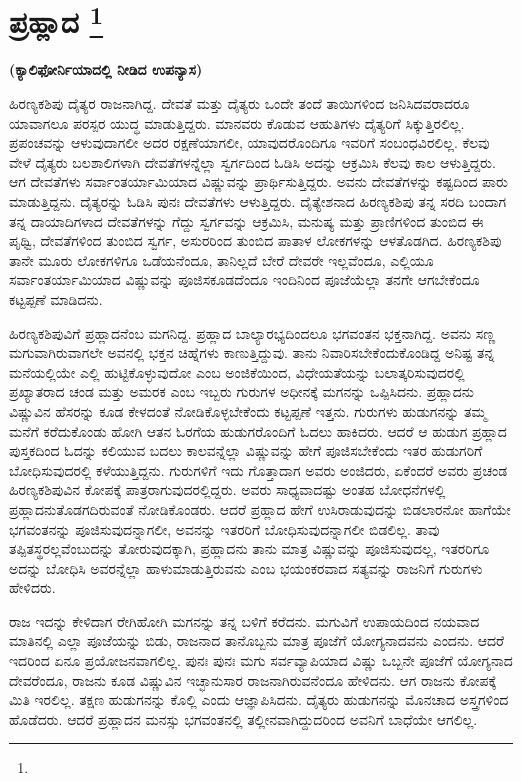 
\chapter[ಪ್ರಹ್ಲಾದ]{ಪ್ರಹ್ಲಾದ \protect\footnote{}}

\centerline{\textbf{(ಕ್ಯಾಲಿಫೋರ್ನಿಯಾದಲ್ಲಿ ನೀಡಿದ ಉಪನ್ಯಾಸ)}}

ಹಿರಣ್ಯಕಶಿಪು ದೈತ್ಯರ ರಾಜನಾಗಿದ್ದ. ದೇವತೆ ಮತ್ತು ದೈತ್ಯರು ಒಂದೇ ತಂದೆ ತಾಯಿಗಳಿಂದ ಜನಿಸಿದವರಾದರೂ ಯಾವಾಗಲೂ ಪರಸ್ಪರ ಯುದ್ಧ ಮಾಡುತ್ತಿದ್ದರು. ಮಾನವರು ಕೊಡುವ ಆಹುತಿಗಳು ದೈತ್ಯರಿಗೆ ಸಿಕ್ಕುತ್ತಿರಲಿಲ್ಲ. ಪ್ರಪಂಚವನ್ನು ಆಳುವುದಾಗಲೀ ಅದರ ರಕ್ಷಣೆಯಾಗಲೀ, ಯಾವುದರೊಂದಿಗೂ ಇವರಿಗೆ ಸಂಬಂಧವಿರಲಿಲ್ಲ. ಕೆಲವು ವೇಳೆ ದೈತ್ಯರು ಬಲಶಾಲಿಗಳಾಗಿ ದೇವತೆಗಳನ್ನೆಲ್ಲಾ ಸ್ವರ್ಗದಿಂದ ಓಡಿಸಿ ಅದನ್ನು ಆಕ್ರಮಿಸಿ ಕೆಲವು ಕಾಲ ಆಳುತ್ತಿದ್ದರು. ಆಗ ದೇವತೆಗಳು ಸರ್ವಾಂತರ್ಯಾಮಿಯಾದ ವಿಷ್ಣುವನ್ನು ಪ್ರಾರ್ಥಿಸುತ್ತಿದ್ದರು. ಅವನು ದೇವತೆಗಳನ್ನು ಕಷ್ಟದಿಂದ ಪಾರು ಮಾಡುತ್ತಿದ್ದನು. ದೈತ್ಯರನ್ನು ಓಡಿಸಿ ಪುನಃ ದೇವತೆಗಳು ಆಳುತ್ತಿದ್ದರು. ದೈತ್ಯೇಶನಾದ ಹಿರಣ್ಯಕಶಿಪು ತನ್ನ ಸರದಿ ಬಂದಾಗ ತನ್ನ ದಾಯಾದಿಗಳಾದ ದೇವತೆಗಳನ್ನು ಗೆದ್ದು ಸ್ವರ್ಗವನ್ನು ಆಕ್ರಮಿಸಿ, ಮನುಷ್ಯ ಮತ್ತು ಪ್ರಾಣಿಗಳಿಂದ ತುಂಬಿದ ಈ ಪೃಥ್ವಿ, ದೇವತೆಗಳಿಂದ ತುಂಬಿದ ಸ್ವರ್ಗ, ಅಸುರರಿಂದ ತುಂಬಿದ ಪಾತಾಳ ಲೋಕಗಳನ್ನು ಆಳತೊಡಗಿದ. ಹಿರಣ್ಯಕಶಿಪು ತಾನೇ ಮೂರು ಲೋಕಗಳಿಗೂ ಒಡೆಯನೆಂದೂ, ತಾನಿಲ್ಲದೆ ಬೇರೆ ದೇವರೇ ಇಲ್ಲವೆಂದೂ, ಎಲ್ಲಿಯೂ ಸರ್ವಾಂತರ್ಯಾಮಿಯಾದ ವಿಷ್ಣುವನ್ನು ಪೂಜಿಸಕೂಡದೆಂದೂ ಇಂದಿನಿಂದ ಪೂಜೆಯೆಲ್ಲಾ ತನಗೇ ಆಗಬೇಕೆಂದೂ ಕಟ್ಟಪ್ಪಣೆ ಮಾಡಿದನು.

ಹಿರಣ್ಯಕಶಿಪುವಿಗೆ ಪ್ರಹ್ಲಾದನೆಂಬ ಮಗನಿದ್ದ. ಪ್ರಹ್ಲಾದ ಬಾಲ್ಯಾರಭ್ಯದಿಂದಲೂ ಭಗವಂತನ ಭಕ್ತನಾಗಿದ್ದ. ಅವನು ಸಣ್ಣ ಮಗುವಾಗಿರುವಾಗಲೇ ಅವನಲ್ಲಿ ಭಕ್ತನ ಚಿಹ್ನೆಗಳು ಕಾಣುತ್ತಿದ್ದುವು. ತಾನು ನಿವಾರಿಸಬೇಕೆಂದುಕೊಂಡಿದ್ದ ಅನಿಷ್ಟ ತನ್ನ ಮನೆಯಲ್ಲಿಯೇ ಎಲ್ಲಿ ಹುಟ್ಟಿಕೊಳ್ಳುವುದೋ ಎಂಬ ಅಂಜಿಕೆಯಿಂದ, ವಿಧೇಯತೆಯನ್ನು ಬಲಾತ್ಕರಿಸುವುದರಲ್ಲಿ ಪ್ರಖ್ಯಾತರಾದ ಚಂಡ ಮತ್ತು ಅಮರಕ ಎಂಬ ಇಬ್ಬರು ಗುರುಗಳ ಅಧೀನಕ್ಕೆ ಮಗನನ್ನು ಒಪ್ಪಿಸಿದನು. ಪ್ರಹ್ಲಾದನು ವಿಷ್ಣುವಿನ ಹೆಸರನ್ನು ಕೂಡ ಕೇಳದಂತೆ ನೋಡಿಕೊಳ್ಳಬೇಕೆಂದು ಕಟ್ಟಪ್ಪಣೆ ಇತ್ತನು. ಗುರುಗಳು ಹುಡುಗನನ್ನು ತಮ್ಮ ಮನೆಗೆ ಕರೆದುಕೊಂಡು ಹೋಗಿ ಆತನ ಓರಗೆಯ ಹುಡುಗರೊಂದಿಗೆ ಓದಲು ಹಾಕಿದರು. ಆದರೆ ಆ ಹುಡುಗ ಪ್ರಹ್ಲಾದ ಪುಸ್ತಕದಿಂದ ಓದನ್ನು ಕಲಿಯುವ ಬದಲು ಕಾಲವನ್ನೆಲ್ಲಾ ವಿಷ್ಣುವನ್ನು ಹೇಗೆ ಪೂಜಿಸಬೇಕೆಂದು ಇತರ ಹುಡುಗರಿಗೆ ಬೋಧಿಸುವುದರಲ್ಲಿ ಕಳೆಯುತ್ತಿದ್ದನು. ಗುರುಗಳಿಗೆ ಇದು ಗೊತ್ತಾದಾಗ ಅವರು ಅಂಜಿದರು, ಏಕೆಂದರೆ ಅವರು ಪ್ರಚಂಡ ಹಿರಣ್ಯಕಶಿಪುವಿನ ಕೋಪಕ್ಕೆ ಪಾತ್ರರಾಗುವುದರಲ್ಲಿದ್ದರು. ಅವರು ಸಾಧ್ಯವಾದಷ್ಟು ಅಂತಹ ಬೋಧನೆಗಳಲ್ಲಿ ಪ್ರಹ್ಲಾದನು\break ತೊಡಗದಿರುವಂತೆ ನೋಡಿಕೊಂಡರು. ಆದರೆ ಪ್ರಹ್ಲಾದ ಹೇಗೆ ಉಸಿರಾಡುವುದನ್ನು ಬಿಡಲಾರನೋ ಹಾಗೆಯೇ ಭಗವಂತನನ್ನು ಪೂಜಿಸುವುದನ್ನಾಗಲೀ, ಅವನನ್ನು ಇತರರಿಗೆ ಬೋಧಿಸುವುದನ್ನಾಗಲೀ ಬಿಡಲಿಲ್ಲ. ತಾವು ತಪ್ಪಿತಸ್ಥರಲ್ಲವೆಂಬುದನ್ನು ತೋರುವುದಕ್ಕಾಗಿ, ಪ್ರಹ್ಲಾದನು ತಾನು ಮಾತ್ರ ವಿಷ್ಣುವನ್ನು ಪೂಜಿಸುವುದಲ್ಲ, ಇತರರಿಗೂ ಅದನ್ನು ಬೋಧಿಸಿ ಅವರನ್ನೆಲ್ಲಾ ಹಾಳುಮಾಡುತ್ತಿರುವನು ಎಂಬ ಭಯಂಕರವಾದ ಸತ್ಯವನ್ನು ರಾಜನಿಗೆ ಗುರುಗಳು ಹೇಳಿದರು.

\vskip 0.3cm

ರಾಜ ಇದನ್ನು ಕೇಳಿದಾಗ ರೇಗಿಹೋಗಿ ಮಗನನ್ನು ತನ್ನ ಬಳಿಗೆ ಕರೆದನು. ಮಗುವಿಗೆ ಉಪಾಯದಿಂದ ನಯವಾದ ಮಾತಿನಲ್ಲಿ ಎಲ್ಲಾ ಪೂಜೆಯನ್ನು ಬಿಡು, ರಾಜನಾದ ತಾನೊಬ್ಬನು ಮಾತ್ರ ಪೂಜೆಗೆ ಯೋಗ್ಯನಾದವನು ಎಂದನು. ಆದರೆ ಇದರಿಂದ ಏನೂ ಪ್ರಯೋಜನವಾಗಲಿಲ್ಲ. ಪುನಃ ಪುನಃ ಮಗು ಸರ್ವವ್ಯಾಪಿಯಾದ ವಿಷ್ಣು ಒಬ್ಬನೇ ಪೂಜೆಗೆ ಯೋಗ್ಯನಾದ ದೇವರೆಂದೂ, ರಾಜನು ಕೂಡ ವಿಷ್ಣುವಿನ ಇಚ್ಛಾನುಸಾರ ರಾಜನಾಗಿರುವನೆಂದೂ ಹೇಳಿದನು. ಆಗ ರಾಜನು ಕೋಪಕ್ಕೆ ಮಿತಿ ಇರಲಿಲ್ಲ. ತಕ್ಷಣ ಹುಡುಗನನ್ನು ಕೊಲ್ಲಿ ಎಂದು ಆಜ್ಞಾಪಿಸಿದನು. ದೈತ್ಯರು ಹುಡುಗನನ್ನು ಮೊನಚಾದ ಅಸ್ತ್ರಗಳಿಂದ ಹೊಡೆದರು. ಆದರೆ ಪ್ರಹ್ಲಾದನ ಮನಸ್ಸು ಭಗವಂತನಲ್ಲಿ ತಲ್ಲೀನವಾಗಿದ್ದುದರಿಂದ ಅವನಿಗೆ ಬಾಧೆಯೇ ಆಗಲಿಲ್ಲ.

